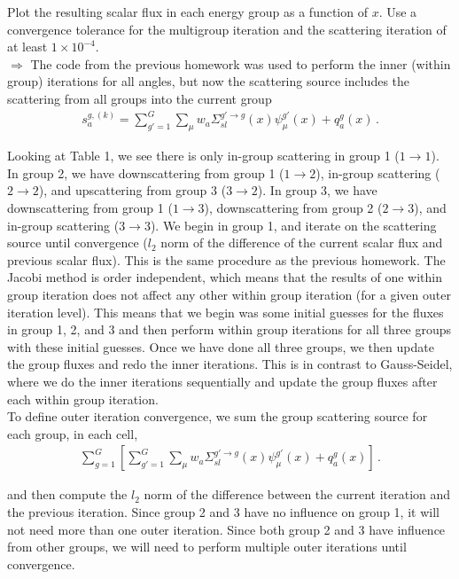 \documentclass[10pt]{article}
\begin{document}
Plot the resulting scalar flux in each energy group as a function of $x$. Use a convergence tolerance for the multigroup iteration and the scattering iteration of at least $1 \times 10^{-4}$.\\


$\Rightarrow$ The code from the previous homework was used to perform the inner (within group) iterations for all angles, but now the scattering source includes the scattering from all groups into the current group
%
\begin{align*}
	s_a^{g,(k)} = \sum_{g'=1}^G \sum_{\mu} w_a \Sigma_{sl}^{g'\rightarrow g}(x) \psi_\mu^{g'}(x) + q_a^g(x)\,.
\end{align*}

Looking at Table 1, we see there is only in-group scattering in group 1 ($1\rightarrow1$). In group 2, we have downscattering from group 1 ($1\rightarrow2$), in-group scattering ($2\rightarrow2$), and upscattering from group 3 ($3\rightarrow2$). In group 3, we have downscattering from group 1 ($1\rightarrow3$), downscattering from group 2 ($2\rightarrow3$), and in-group scattering ($3\rightarrow3$). We begin in group 1, and iterate on the scattering source until convergence ($l_2$ norm of the difference of the current scalar flux and previous scalar flux). This is the same procedure as the previous homework. The Jacobi method is order independent, which means that the results of one within group iteration does not affect any other within group iteration (for a given outer iteration level). This means that we begin was some initial guesses for the fluxes in group 1, 2, and 3 and then perform within group iterations for all three groups with these initial guesses. Once we have done all three groups, we then update the group fluxes and redo the inner iterations. This is in contrast to Gauss-Seidel, where we do the inner iterations sequentially and update the group fluxes after each within group iteration. \\

To define outer iteration convergence, we sum the group scattering source for each group, in each cell, 
%
\begin{align*}
	\sum_{g=1}^G \left[ \sum_{g'=1}^G \sum_{\mu} w_a \Sigma_{sl}^{g'\rightarrow g}(x) \psi_\mu^{g'}(x) + q_a^g(x) \right] \,.
\end{align*}

and then compute the $l_2$ norm of the difference between the current iteration and the previous iteration. Since group 2 and 3 have no influence on group 1, it will not need more than one outer iteration. Since both group 2 and 3 have influence from other groups, we will need to perform multiple outer iterations until convergence. \\
\end{document}

